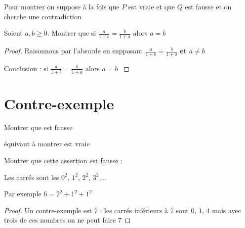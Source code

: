 \begin{frame}


Pour montrer  on suppose à la fois que $P$ est vraie et que $Q$ est fausse 
et on cherche une contradiction

\pause

\begin{exemple}
Soient $a,b \ge 0$. Montrer que si $\frac{a}{1+b}=\frac{b}{1+a}$ alors $a=b$
\end{exemple}

\pause

\begin{proof}
Raisonnons par l'absurde en supposant $\frac{a}{1+b}=\frac{b}{1+a}$ \textbf{et} $a \neq b$
\bigskip 



\pause\pause\pause

{
Conclusion : si $\frac{a}{1+b}=\frac{b}{1+a}$ alors $a=b$
}
\end{proof}
  
\end{frame}


\section{Contre-exemple}

\begin{frame}


Montrer que  est fausse

équivaut à montrer  
est vraie

\pause
\bigskip

\begin{exemple}
Montrer que cette assertion est fausse :

\qquad {}
\end{exemple}

\pause

Les carrés sont les $0^2$, $1^2$, $2^2$, $3^2$,... 

Par exemple $6 = 2^2+1^2+1^2$

\pause
\bigskip

\begin{proof}
Un contre-exemple est $7$ \pause : les carrés inférieurs à $7$ sont $0$, $1$, $4$
mais avec trois de ces nombres on ne peut faire $7$
\end{proof}  

\end{frame}


